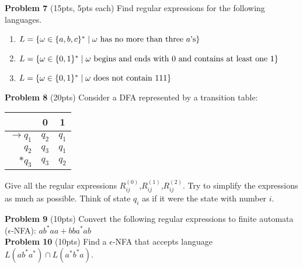 \documentclass{article}
\begin{document}
\noindent \textbf{Problem 7} (15pts, 5pts each) Find regular expressions for the following languages.
\begin{enumerate}
    \item $L = \{ \omega \in \{ a,b,c \}^* \mid \omega \mbox{ has no more than three $a$'s} \}$
    \item $L = \{ \omega \in \{ 0,1 \}^* \mid \omega \mbox{ begins and ends with 0 and contains at least one 1} \}$
    \item $L = \{ \omega \in \{ 0,1 \}^* \mid \omega \mbox{ does not contain 111} \}$ 
\end{enumerate}

\noindent \textbf{Problem 8} (20pts) Consider a DFA represented by a transition table:
\begin{center}
\small
\begin{tabular}{r|c|c}
& 0 & 1 \\ \hline
$\rightarrow q_1$ & $q_2$ & $q_1$ \\ 
$q_2$ & $q_3$ & $q_1$ \\ 
$*q_3$ & $q_3$ & $q_2$
\end{tabular}
\end{center}
Give all the regular expressions $R^{(0)}_{ij}$,$R^{(1)}_{ij}$,$R^{(2)}_{ij}$. Try to simplify the expressions as much as possible.
Think of state $q_i$ as if it were the state with number $i$.

\noindent \newline \textbf{Problem 9} (10pts) Convert the following regular expressions to finite automata ($\epsilon$-NFA): $ab^*aa+bba^*ab$ \\

\noindent \textbf{Problem 10} (10pts) Find a $\epsilon$-NFA that accepts language $L(ab^*a^*)\cap L(a^*b^*a)$.
\end{document}
